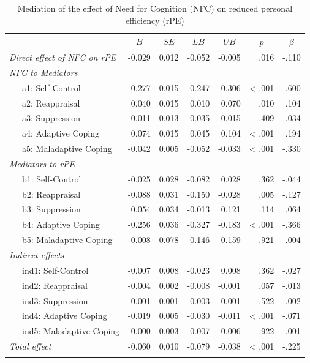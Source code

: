 \documentclass[
  english,
  man]{apa6}
\begin{document}
\begin{table}[tbp]

\begin{center}
\begin{threeparttable}

\caption{\label{tab:RQ4}Mediation of the effect of Need for Cognition (NFC) on reduced personal efficiency (rPE)}

\footnotesize{

\begin{tabular}{lrrrrrr}
\toprule
 & \multicolumn{1}{c}{$B$} & \multicolumn{1}{c}{$SE$} & \multicolumn{1}{c}{$LB$} & \multicolumn{1}{c}{$UB$} & \multicolumn{1}{c}{$p$} & \multicolumn{1}{c}{$\beta$}\\
\midrule
\textit{Direct effect of NFC on rPE} & -0.029 & 0.012 & -0.052 & -0.005 & .016 & -.110\\ \midrule
\textit{NFC to Mediators} &  &  &  &  &  & \\
\ \ \ a1: Self-Control & 0.277 & 0.015 & 0.247 & 0.306 & < .001 & .600\\
\ \ \ a2: Reappraisal & 0.040 & 0.015 & 0.010 & 0.070 & .010 & .104\\
\ \ \ a3: Suppression & -0.011 & 0.013 & -0.035 & 0.015 & .409 & -.034\\
\ \ \ a4: Adaptive Coping & 0.074 & 0.015 & 0.045 & 0.104 & < .001 & .194\\
\ \ \ a5: Maladaptive Coping & -0.042 & 0.005 & -0.052 & -0.033 & < .001 & -.330\\ \midrule
\textit{Mediators to rPE} &  &  &  &  &  & \\
\ \ \ b1: Self-Control & -0.025 & 0.028 & -0.082 & 0.028 & .362 & -.044\\
\ \ \ b2: Reappraisal & -0.088 & 0.031 & -0.150 & -0.028 & .005 & -.127\\
\ \ \ b3: Suppression & 0.054 & 0.034 & -0.013 & 0.121 & .114 & .064\\
\ \ \ b4: Adaptive Coping & -0.256 & 0.036 & -0.327 & -0.183 & < .001 & -.366\\
\ \ \ b5: Maladaptive Coping & 0.008 & 0.078 & -0.146 & 0.159 & .921 & .004\\ \midrule
\textit{Indirect effects} &  &  &  &  &  & \\
\ \ \ ind1: Self-Control & -0.007 & 0.008 & -0.023 & 0.008 & .362 & -.027\\
\ \ \ ind2: Reappraisal & -0.004 & 0.002 & -0.008 & -0.001 & .057 & -.013\\
\ \ \ ind3: Suppression & -0.001 & 0.001 & -0.003 & 0.001 & .522 & -.002\\
\ \ \ ind4: Adaptive Coping & -0.019 & 0.005 & -0.030 & -0.011 & < .001 & -.071\\
\ \ \ ind5: Maladaptive Coping & 0.000 & 0.003 & -0.007 & 0.006 & .922 & -.001\\ \midrule
\textit{Total effect} & -0.060 & 0.010 & -0.079 & -0.038 & < .001 & -.225\\
\bottomrule
\addlinespace
\end{tabular}

}
\end{threeparttable}
\end{center}
\end{table}
\end{document}
